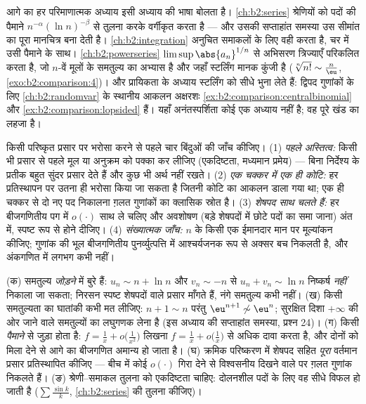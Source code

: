 \begin{remark}[इसी खंड के भीतर के परिप्रेक्ष्य]\label{rem:b2:comparison:perspectives}
आगे का हर परिमाणात्मक अध्याय इसी अध्याय की भाषा बोलता है। \cref{ch:b2:series} श्रेणियों
को पदों की पैमाने $n^{-\alpha}(\ln n)^{-\beta}$ से तुलना करके वर्गीकृत करता है --- और उसकी
सप्ताहांत समस्या उस सीमांत का पूरा मानचित्र बना देती है। \cref{ch:b2:integration} अनुचित
समाकलों के लिए वही करता है,  चर में उसी पैमाने के साथ। \cref{ch:b2:powerseries} $\limsup\abs{a_n}^{1/n}$ से
अभिसरण त्रिज्याएँ परिकलित करता है, जो $n$-वें मूलों के समतुल्य का अभ्यास
है और जहाँ स्टर्लिंग मानक कुंजी है ($\sqrt[n]{n!}
\sim \frac n\eu$, \cref{exo:b2:comparison:4})। और प्रायिकता के अध्याय
स्टर्लिंग को सीधे भुना लेते हैं: द्विपद गुणांकों के लिए \cref{ch:b2:randomvar} के स्थानीय
आकलन अक्षरशः \cref{ex:b2:comparison:centralbinomial} और \cref{ex:b2:comparison:lopsided} हैं। यहाँ अनंतस्पर्शिता कोई एक अध्याय नहीं है;
वह पूरे खंड का लहजा है।
\end{remark}

\begin{method}[क्रमिक परिष्करण की जाँच-सूची]\label{met:b2:comparison:checklist}
किसी परिष्कृत प्रसार पर भरोसा करने से पहले चार बिंदुओं की जाँच कीजिए।
(1) \emph{पहले अस्तित्व:} किसी भी प्रसार से पहले मूल या अनुक्रम को
पक्का कर लीजिए (एकदिष्टता, मध्यमान प्रमेय) --- बिना निर्देश्य के प्रतीक
बहुत सुंदर प्रसार देते हैं और कुछ भी अर्थ नहीं रखते। (2) \emph{एक चक्कर
में एक ही कोटि:} हर प्रतिस्थापन पर उतना ही भरोसा किया जा सकता है जितनी
कोटि का आकलन डाला गया था; एक ही चक्कर से दो नए पद निकालना ग़लत गुणांकों
का क्लासिक स्रोत है। (3) \emph{शेषपद साथ चलते हैं:} हर बीजगणितीय पग में
$o(\cdot)$ साथ ले चलिए और अवशोषण (बड़े शेषपदों में छोटे पदों का समा जाना) अंत
में, स्पष्ट रूप से होने दीजिए। (4) \emph{संख्यात्मक जाँच:} $n$ के किसी
एक ईमानदार मान पर मूल्यांकन कीजिए; गुणांक की भूल बीजगणितीय पुनर्व्युत्पत्ति
में आश्चर्यजनक रूप से अक्सर बच निकलती है, और अंकगणित में लगभग कभी नहीं।
\end{method}

\begin{remark}[सामान्य भूलें]\label{rem:b2:comparison:pitfalls}
(क) समतुल्य \emph{जोड़ने} में बुरे हैं: $u_n \sim n + \ln n$ और $v_n \sim -n$ से $u_n + v_n \sim \ln
n$ निष्कर्ष
\emph{नहीं} निकाला जा सकता; निरसन स्पष्ट शेषपदों वाले प्रसार माँगते हैं,
नंगे समतुल्य कभी नहीं। (ख) किसी समतुल्यता का घातांकी कभी मत लीजिए: $n + 1 \sim n$
परंतु $\eu^{n+1} \not\sim \eu^n$; सुरक्षित दिशा $+\infty$ की ओर जाने वाले समतुल्यों का लघुगणक लेना
है (इस अध्याय की सप्ताहांत समस्या, प्रश्न 24)। (ग) 
किसी \emph{पैमाने} से जुड़ा होता है: $f = \frac1x + o\bigl(\frac1{x^2}\bigr)$ लिखना $f =
\frac1x + o\bigl(\frac1x\bigr)$ से अधिक दावा करता है,
और दोनों को मिला देने से आगे का बीजगणित अमान्य हो जाता है। (घ) क्रमिक
परिष्करण में शेषपद सहित \emph{पूरा} वर्तमान प्रसार प्रतिस्थापित कीजिए ---
बीच में कोई $o(\cdot)$ गिरा देने से विश्वसनीय दिखने वाले पर ग़लत गुणांक निकलते
हैं। (ङ) श्रेणी--समाकल तुलना को एकदिष्टता चाहिए: दोलनशील पदों के लिए वह
सीधे विफल हो जाती है ($\sum\frac{\sin k}k$, \cref{ch:b2:series} की तुलना कीजिए)।
\end{remark}

